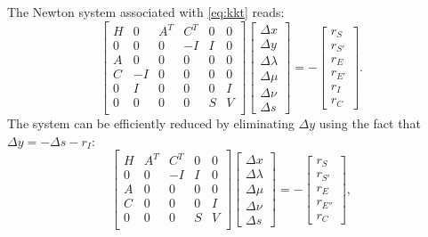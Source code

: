 \documentclass{article}
\begin{document}
\par
The Newton system associated with \eqref{eq:kkt} reads:
\begin{equation}
\begin{bmatrix}
H & 0	& A^T 	& C^T	& 0 & 0 	\\
0 & 0	& 0 	& -I	& I & 0		\\
A & 0	& 0 	&  0	& 0 & 0		\\
C & -I	& 0 	&  0	& 0 & 0		\\
0 & I	& 0 	&  0	& 0 & I	\\
0 & 0	& 0 	& 0		& S & V		\\
\end{bmatrix}
\begin{bmatrix}
\Delta x \\ \Delta y \\ \Delta \lambda \\ \Delta \mu \\\Delta \nu \\ \Delta s
\end{bmatrix}
=
-\begin{bmatrix}
r_{S} \\ r_{S'} \\ r_E \\ r_{E'} \\ r_I \\ r_C
\end{bmatrix}.
\end{equation}
The system can be efficiently reduced by eliminating $\Delta y$ using the fact that $\Delta y = -\Delta s - r_I$:
\begin{equation}
\begin{bmatrix}
H 	& A^T 	& C^T	& 0 & 0 	\\
0 	& 0 	& -I	& I & 0		\\
A 	& 0 	&  0	& 0 & 0		\\
C 	& 0 	&  0	& 0 & I	\\
0 	& 0 	& 0		& S & V		\\
\end{bmatrix}
\begin{bmatrix}
\Delta x \\ \Delta \lambda \\ \Delta \mu \\\Delta \nu \\ \Delta s
\end{bmatrix}
=
-\begin{bmatrix}
r_{S} \\ r_{S'} \\ r_E \\ r_{E''} \\ r_C
\end{bmatrix},
\end{equation}
\end{document}
